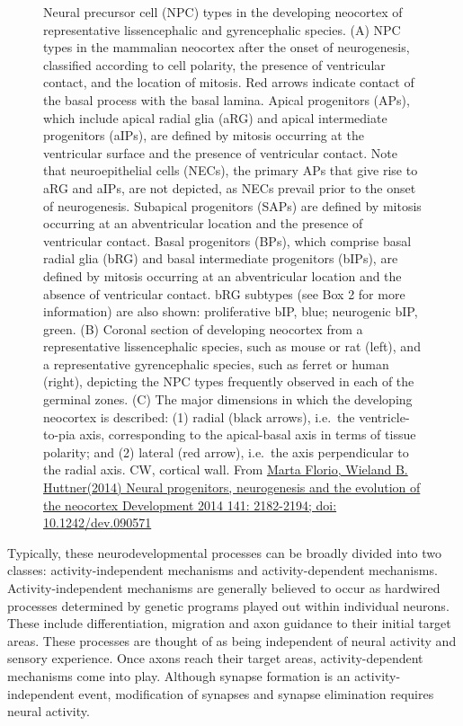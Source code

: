 \begin{figure}
\caption{Neural precursor cell (NPC) types in the developing neocortex of representative lissencephalic and gyrencephalic species. (A) NPC types in the mammalian neocortex after the onset of neurogenesis, classified according to cell polarity, the presence of ventricular contact, and the location of mitosis. Red arrows indicate contact of the basal process with the basal lamina. Apical progenitors (APs), which include apical radial glia (aRG) and apical intermediate progenitors (aIPs), are defined by mitosis occurring at the ventricular surface and the presence of ventricular contact. Note that neuroepithelial cells (NECs), the primary APs that give rise to aRG and aIPs, are not depicted, as NECs prevail prior to the onset of neurogenesis. Subapical progenitors (SAPs) are defined by mitosis occurring at an abventricular location and the presence of ventricular contact. Basal progenitors (BPs), which comprise basal radial glia (bRG) and basal intermediate progenitors (bIPs), are defined by mitosis occurring at an abventricular location and the absence of ventricular contact. bRG subtypes (see Box 2 for more information) are also shown: proliferative bIP, blue; neurogenic bIP, green. (B) Coronal section of developing neocortex from a representative lissencephalic species, such as mouse or rat (left), and a representative gyrencephalic species, such as ferret or human (right), depicting the NPC types frequently observed in each of the germinal zones. (C) The major dimensions in which the developing neocortex is described: (1) radial (black arrows), i.e.~the ventricle-to-pia axis, corresponding to the apical-basal axis in terms of tissue polarity; and (2) lateral (red arrow), i.e.~the axis perpendicular to the radial axis. CW, cortical wall. From \href{https://dev.biologists.org/content/141/11/2182}{Marta Florio, Wieland B. Huttner(2014) Neural progenitors, neurogenesis and the evolution of the neocortex Development 2014 141: 2182-2194; doi: 10.1242/dev.090571}}\label{fig:neuralprecursor}
\end{figure}

Typically, these neurodevelopmental processes can be broadly divided into two classes: activity-independent mechanisms and activity-dependent mechanisms. Activity-independent mechanisms are generally believed to occur as hardwired processes determined by genetic programs played out within individual neurons. These include differentiation, migration and axon guidance to their initial target areas. These processes are thought of as being independent of neural activity and sensory experience. Once axons reach their target areas, activity-dependent mechanisms come into play. Although synapse formation is an activity-independent event, modification of synapses and synapse elimination requires neural activity.


